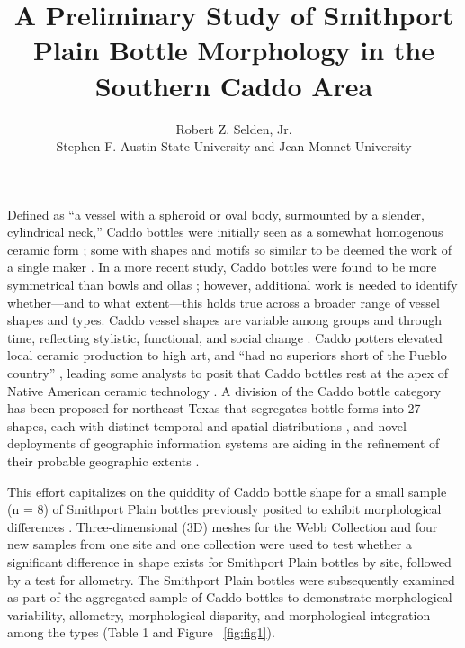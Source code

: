 \documentclass[article]{sa}
\author{Robert Z. Selden, Jr.\\Stephen F. Austin State University and Jean Monnet University}
\title{A Preliminary Study of Smithport Plain Bottle Morphology in the Southern Caddo Area}
\begin{document}

\section*{}
Defined as ``a vessel with a spheroid or oval body, surmounted by a slender, cylindrical neck,'' Caddo bottles were initially seen as a somewhat homogenous ceramic form \cite[187]{RN2151}; some with shapes and motifs so similar to be deemed the work of a single maker \cite[188]{RN2151}. In a more recent study, Caddo bottles were found to be more symmetrical than bowls and ollas \citep{RN11521}; however, additional work is needed to identify whether—and to what extent—this holds true across a broader range of vessel shapes and types. Caddo vessel shapes are variable among groups and through time, reflecting stylistic, functional, and social change \citep{RN1986}. Caddo potters elevated local ceramic production to high art, and ``had no superiors short of the Pueblo country'' \citep[239]{RN491}, leading some analysts to posit that Caddo bottles rest at the apex of Native American ceramic technology \citep{RN1867}. A division of the Caddo bottle category has been proposed for northeast Texas that segregates bottle forms into 27 shapes, each with distinct temporal and spatial distributions \citep[Figure 2]{RN11636}, and novel deployments of geographic information systems are aiding in the refinement of their probable geographic extents \cite{RN2674}.

This effort capitalizes on the quiddity of Caddo bottle shape for a small sample (n = 8) of Smithport Plain bottles previously posited to exhibit morphological differences \citep{RN11716,RN870,RN5266}. Three-dimensional (3D) meshes for the Webb Collection and four new samples from one site and one collection were used to test whether a significant difference in shape exists for Smithport Plain bottles by site, followed by a test for allometry. The Smithport Plain bottles were subsequently examined as part of the aggregated sample of Caddo bottles to demonstrate morphological variability, allometry, morphological disparity, and morphological integration among the types (Table 1 and Figure ~\ref{fig:fig1}).
\end{document}
